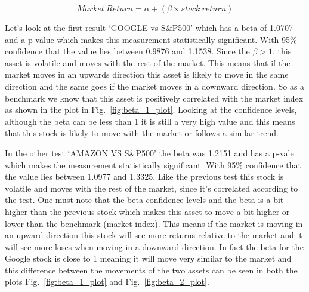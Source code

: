 \begin{equation} \label{eq:beta}
    Market \ Return = \alpha + (\beta \times stock \ return)
\end{equation}

\noindent
Let’s look at the first result ‘GOOGLE vs S\&P500’ which has a beta of 1.0707 and a p-value which makes this measurement statistically significant. With 95\% confidence that the value lies between 0.9876 and 1.1538. Since the $\beta > 1$, this asset is volatile and moves with the rest of the market. This means that if the market moves in an upwards direction this asset is likely to move in the same direction and the same goes if the market moves in a downward direction. So as a benchmark we know that this asset is positively correlated with the market index as shown in the plot in Fig.~\ref{fig:beta_1_plot}. Looking at the confidence levels, although the beta can be less than 1 it is still a very high value and this means that this stock is likely to move with the market or follows a similar trend. 

\noindent
In the other test ‘AMAZON VS S\&P500’ the beta was 1.2151 and has a p-vale which makes the measurement statistically significant. With 95\% confidence that the value lies between 1.0977 and 1.3325. Like the previous test this stock is volatile and moves with the rest of the market, since it’s correlated according to the test. One must note that the beta confidence levels and the beta is a bit higher than the previous stock which makes this asset to move a bit higher or lower than the benchmark (market-index). This means if the market is moving in an upward direction this stock will see more returns relative to the market and it will see more loses when moving in a downward direction. In fact the beta for the Google stock is close to 1 meaning it will move very similar to the market and this difference between the movements of the two assets can be seen in both the plots Fig.~\ref{fig:beta_1_plot} and Fig.~\ref{fig:beta_2_plot}. 

